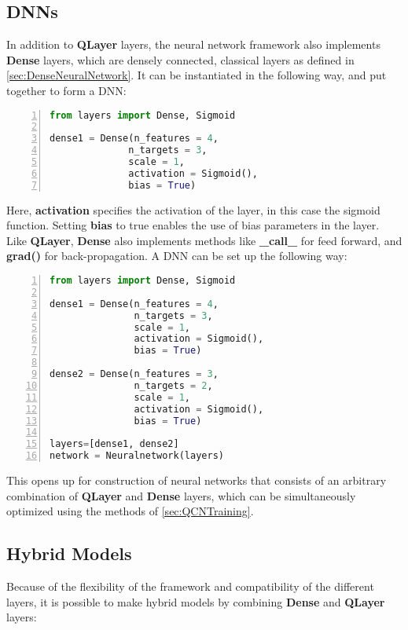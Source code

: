 \subsection{DNNs}\label{sec:DNNs}
In addition to \textbf{QLayer} layers, the neural network framework also implements \textbf{Dense} layers, which are densely connected, classical layers as defined in \autoref{sec:DenseNeuralNetwork}. It can be instantiated in the following way, and put together to form a DNN:

\begin{lstlisting}[language=python, numbers=left]
from layers import Dense, Sigmoid

dense1 = Dense(n_features = 4,
              n_targets = 3,
              scale = 1,
              activation = Sigmoid(),
              bias = True)
\end{lstlisting}
Here, \textbf{activation} specifies the activation of the layer, in this case the sigmoid function. Setting \textbf{bias} to true enables the use of bias parameters in the layer. Like \textbf{QLayer}, \textbf{Dense} also implements methods like \textbf{\_call\_} for feed forward, and \textbf{grad()} for back-propagation. A DNN can be set up the following way:

\begin{lstlisting}[language=python, numbers=left]
from layers import Dense, Sigmoid

dense1 = Dense(n_features = 4,
               n_targets = 3,
               scale = 1,
               activation = Sigmoid(),
               bias = True)
               
dense2 = Dense(n_features = 3,
               n_targets = 2,
               scale = 1,
               activation = Sigmoid(),
               bias = True)
               
layers=[dense1, dense2]       
network = Neuralnetwork(layers)
\end{lstlisting}

This opens up for construction of neural networks that consists of an arbitrary combination of \textbf{QLayer} and \textbf{Dense} layers, which can be simultaneously optimized using the methods of \autoref{sec:QCNTraining}.

\subsection{Hybrid Models}\label{sec:Hybrid Models}
Because of the flexibility of the framework and compatibility of the different layers, it is possible to make hybrid models by combining \textbf{Dense} and \textbf{QLayer} layers:

